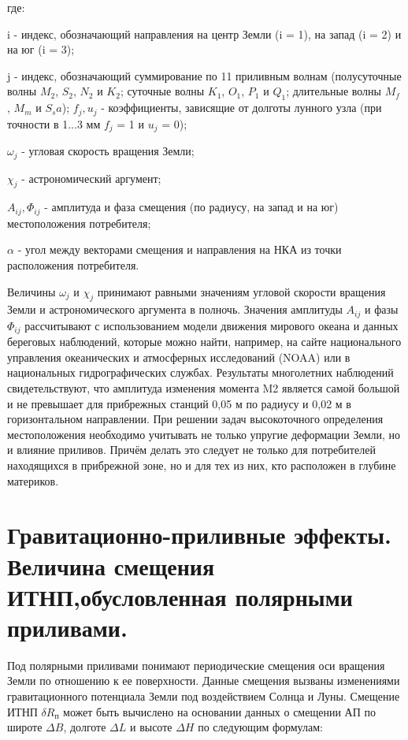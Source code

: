 \documentclass[14pt,a4paper,oneside]{extarticle}
\begin{document}
где:

i - индекс, обозначающий направления на центр Земли (i = 1), на запад (i = 2) и на юг (i = 3); 

j - индекс, обозначающий суммирование по 11 приливным волнам (полусуточные волны $M_2$, $S_2$, $N_2$ и $K_2$; суточные волны $K_1$, $O_1$, $P_1$ и $Q_1$; длительные волны $M_f$ , $M_m$ и $S_sa$);
$f_j, u_j$ - коэффициенты, зависящие от долготы лунного узла (при точности в 1...3 мм $f_j$ = 1 и $u_j$ = 0); 

$\omega_{j}$ - угловая скорость вращения Земли; 

$\chi_{j}$ - астрономический аргумент; 

$A_{ij}, \Phi_{ij}$ - амплитуда и фаза смещения (по радиусу, на запад и на юг) местоположения потребителя; 

$\alpha$ - угол между векторами смещения и направления на НКА из точки расположения потребителя.

Величины $\omega_{j}$ и $\chi_{j}$ принимают равными значениям угловой скорости вращения Земли и астрономического аргумента в полночь.
Значения амплитуды $A_{ij}$ и фазы $\Phi_{ij}$ рассчитывают с использованием модели движения мирового океана и данных береговых наблюдений, которые можно найти, например, на сайте национального управления океанических и атмосферных исследований (NOAA) или в национальных гидрографических службах. 
Результаты многолетних наблюдений свидетельствуют, что амплитуда изменения момента M2 является самой большой и не превышает для прибрежных станций 0,05 м по радиусу и 0,02 м в горизонтальном направлении. 
При решении задач высокоточного определения местоположения необходимо учитывать не только упругие деформации Земли, но и влияние приливов. 
Причём делать это следует не только для потребителей находящихся в прибрежной зоне, но и для тех из них, кто расположен в глубине материков.

\section{Гравитационно-приливные эффекты. Величина смещения ИТНП,обусловленная полярными приливами.}

Под полярными приливами понимают периодические смещения оси вращения Земли по отношению к ее поверхности. 
Данные смещения вызваны изменениями гравитационного потенциала Земли под воздействием Солнца и Луны. 
Смещение ИТНП $\delta R_\text{п}$ может быть вычислено на основании данных о смещении АП по широте $\Delta B$, долготе $\Delta L$ и высоте $\Delta H$ по следующим формулам:
\end{document}
